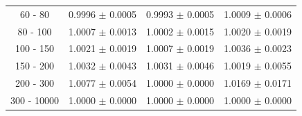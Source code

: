 \begin{table}[htb]
\begin{center}
\begin{tabular}{c|c|c|c}
    60 -   80  & 	0.9996 $\pm$ 0.0005 & 	0.9993 $\pm$ 0.0005 & 	1.0009 $\pm$ 0.0006 \\
    80 -  100  & 	1.0007 $\pm$ 0.0013 & 	1.0002 $\pm$ 0.0015 & 	1.0020 $\pm$ 0.0019 \\
   100 -  150  & 	1.0021 $\pm$ 0.0019 & 	1.0007 $\pm$ 0.0019 & 	1.0036 $\pm$ 0.0023 \\
   150 -  200  & 	1.0032 $\pm$ 0.0043 & 	1.0031 $\pm$ 0.0046 & 	1.0019 $\pm$ 0.0055 \\
   200 -  300  & 	1.0077 $\pm$ 0.0054 & 	1.0000 $\pm$ 0.0000 & 	1.0169 $\pm$ 0.0171 \\
   300 - 10000  & 	1.0000 $\pm$ 0.0000 & 	1.0000 $\pm$ 0.0000 & 	1.0000 $\pm$ 0.0000 \\
\hline
\hline


\end{tabular}
\end{center}
\end{table}

